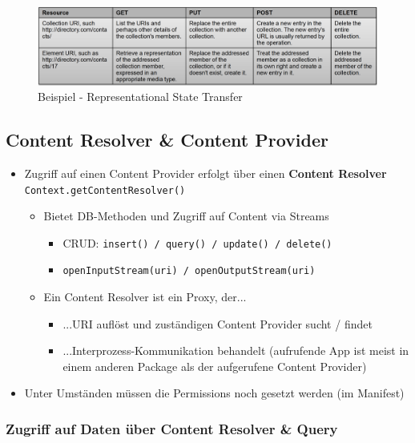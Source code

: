 \documentclass[a4paper]{article}
\begin{document}
\begin{figure}[htb!]
	\centering
	\includegraphics[width=\textwidth]{img/state_transfer.png}
	\caption{Beispiel - Representational State Transfer}
\end{figure}

\newpage

\subsection{Content Resolver \& Content Provider}

\begin{itemize}
	\item Zugriff auf einen Content Provider erfolgt über einen \textbf{Content Resolver}\\
	\texttt{Context.getContentResolver()}
		\begin{itemize}
			\item Bietet DB-Methoden und Zugriff auf Content via Streams
				\begin{itemize}
					\item CRUD: \texttt{insert() / query() / update() / delete()}
					\item \texttt{openInputStream(uri) / openOutputStream(uri)}
				\end{itemize}
			\item Ein Content Resolver ist ein Proxy, der...
				\begin{itemize}
					\item ...URI auflöst und zuständigen Content Provider sucht / findet
					\item ...Interprozess-Kommunikation behandelt (aufrufende App ist meist in einem anderen Package als der aufgerufene Content Provider)
				\end{itemize}
		\end{itemize}
	\item Unter Umständen müssen die Permissions noch gesetzt werden (im Manifest)
\end{itemize}
	
\subsubsection{Zugriff auf Daten über Content Resolver \& Query}	
\end{document}
